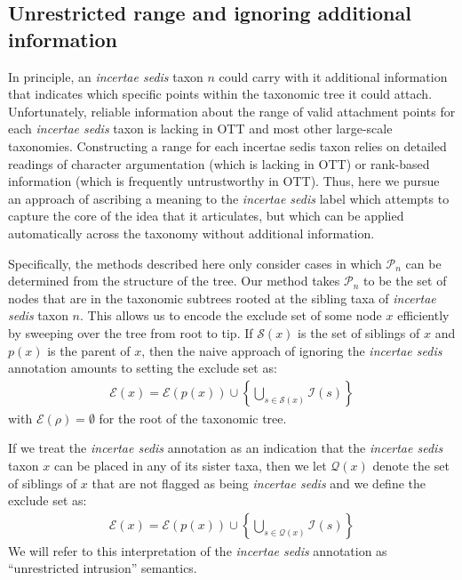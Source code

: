 \documentclass[english]{article}
\begin{document}
\subsection{Unrestricted range and ignoring additional information}
In principle, an \emph{incertae sedis} taxon $n$ could carry with it additional
    information that indicates which specific points within the taxonomic tree
    it could attach.
Unfortunately, reliable information about the range of valid attachment points
for each \emph{incertae sedis} taxon is lacking in OTT and most other large-scale
taxonomies.
Constructing a range for each incertae sedis taxon relies on detailed
readings of character argumentation (which is lacking in OTT) or rank-based
information (which is frequently untrustworthy in OTT). Thus, here we pursue
an approach of ascribing a meaning to the \emph{incertae sedis} label which
attempts to capture the core of the idea that it articulates, but which can be
applied automatically across the taxonomy without additional information.


Specifically, the methods described here only consider cases in which 
    $\mathcal{P}_n$ can be determined from the structure of the tree.
Our method takes $\mathcal{P}_n$ to be the set of nodes that
    are in the taxonomic subtrees rooted at the sibling taxa of \emph{incertae sedis} taxon $n$.
This allows us to encode the exclude set of some node $x$ efficiently by sweeping
    over the tree from root to tip.
If $\mathcal{S}(x)$ is the set of siblings of $x$ and $p(x)$ is the parent of $x$, then
the naive approach of ignoring the \emph{incertae sedis}  annotation amounts to setting
    the exclude set as:
\begin{align}
    \mathcal{E}(x) = \mathcal{E}(p(x)) \cup \left\{ \bigcup_{s\in \mathcal{S}(x)} \mathcal{I}(s) \right\}
    \label{eq:exsetformonea-traditional}
\end{align}
with $\mathcal{E}(\rho) = \emptyset$ for the root of the taxonomic tree.

If we treat the  \emph{incertae sedis} annotation as an indication that the 
    \emph{incertae sedis} taxon $x$ can be placed in any of its sister taxa, then
    we let $\mathcal{Q}(x)$ denote the set of siblings of $x$ that are not
    flagged as being \emph{incertae sedis} and we define the exclude set as:
\begin{align}
    \mathcal{E}(x) = \mathcal{E}(p(x)) \cup \left\{ \bigcup_{s\in \mathcal{Q}(x)} \mathcal{I}(s)\right\}
    \label{eq:exsetformonea}
\end{align}
We will refer to this interpretation of the \emph{incertae sedis} annotation as ``unrestricted
    intrusion'' semantics.
\end{document}
